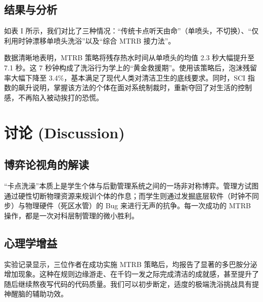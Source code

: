 ﻿\documentclass[10pt, conference, a4paper]{IEEEtran}
\begin{document}
\subsection{结果与分析}
如表 I 所示，我们对比了三种情况：“传统卡点听天由命”（单喷头，不切换）、“仅利用时钟漂移单喷头洗浴”以及“综合 MTRB 接力法”。

\begin{table}[htbp]
\caption{不同策略下的洗浴质量评估数据总结}
\begin{center}
\label{tab:results}
\end{center}
\end{table}


数据清晰地表明，MTRB 策略将残存热水时间从单喷头的均值 2.3 秒大幅提升至 7.1 秒。这 7 秒钟构成了洗浴行为学上的“黄金救援期”。使用该策略后，泡沫残留率大幅下降至 3.4\%，基本满足了现代人类对清洁卫生的底线要求。同时，SCI 指数的飙升说明，掌握该方法的个体在面对系统制裁时，重新夺回了对生活的控制感，不再陷入被动挨打的恐慌。

\section{讨论 (Discussion)}

\subsection{博弈论视角的解读}
“卡点洗澡”本质上是学生个体与后勤管理系统之间的一场非对称博弈。管理方试图通过硬性切断物理资源来规训个体的作息；而学生则通过发掘底层软件（时钟不同步）与物理硬件（死区水管）的 Bug 来进行无声的抗争。每一次成功的 MTRB 操作，都是一次对科层制管理的微小胜利。

\subsection{心理学增益}
实验记录显示，三位作者在成功实施 MTRB 策略后，均报告了显著的多巴胺分泌增加现象。这种在规则边缘游走、在千钧一发之际完成清洁的成就感，甚至提升了随后继续熬夜写代码的代码质量。我们可以初步断定，适度的极端洗浴挑战具有提神醒脑的辅助功效。
\end{document}
